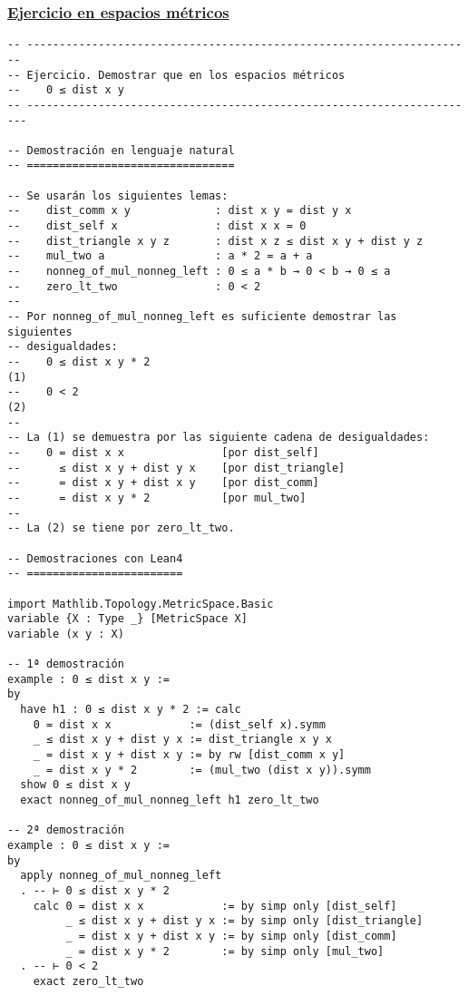 \subsubsection{\href{./src/Basicos/Ejercicio\_en\_espacios\_metricos.lean}{Ejercicio en espacios métricos}}
\label{sec:org4f1d30a}
\begin{verbatim}
-- ---------------------------------------------------------------------
-- Ejercicio. Demostrar que en los espacios métricos
--    0 ≤ dist x y
-- ----------------------------------------------------------------------

-- Demostración en lenguaje natural
-- ================================

-- Se usarán los siguientes lemas:
--    dist_comm x y             : dist x y = dist y x
--    dist_self x               : dist x x = 0
--    dist_triangle x y z       : dist x z ≤ dist x y + dist y z
--    mul_two a                 : a * 2 = a + a
--    nonneg_of_mul_nonneg_left : 0 ≤ a * b → 0 < b → 0 ≤ a
--    zero_lt_two               : 0 < 2
--
-- Por nonneg_of_mul_nonneg_left es suficiente demostrar las siguientes
-- desigualdades:
--    0 ≤ dist x y * 2                                               (1)
--    0 < 2                                                          (2)
--
-- La (1) se demuestra por las siguiente cadena de desigualdades:
--    0 = dist x x               [por dist_self]
--      ≤ dist x y + dist y x    [por dist_triangle]
--      = dist x y + dist x y    [por dist_comm]
--      = dist x y * 2           [por mul_two]
--
-- La (2) se tiene por zero_lt_two.

-- Demostraciones con Lean4
-- ========================

import Mathlib.Topology.MetricSpace.Basic
variable {X : Type _} [MetricSpace X]
variable (x y : X)

-- 1ª demostración
example : 0 ≤ dist x y :=
by
  have h1 : 0 ≤ dist x y * 2 := calc
    0 = dist x x            := (dist_self x).symm
    _ ≤ dist x y + dist y x := dist_triangle x y x
    _ = dist x y + dist x y := by rw [dist_comm x y]
    _ = dist x y * 2        := (mul_two (dist x y)).symm
  show 0 ≤ dist x y
  exact nonneg_of_mul_nonneg_left h1 zero_lt_two

-- 2ª demostración
example : 0 ≤ dist x y :=
by
  apply nonneg_of_mul_nonneg_left
  . -- ⊢ 0 ≤ dist x y * 2
    calc 0 = dist x x            := by simp only [dist_self]
         _ ≤ dist x y + dist y x := by simp only [dist_triangle]
         _ = dist x y + dist x y := by simp only [dist_comm]
         _ = dist x y * 2        := by simp only [mul_two]
  . -- ⊢ 0 < 2
    exact zero_lt_two


\end{verbatim}

